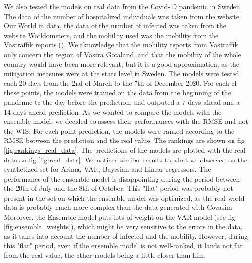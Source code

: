 We also tested the models on real data from the Covid-19 pandemic in Sweden. 
The data of the number of hospitalized individuals was taken from the website \href{https://ourworldindata.org/covid-hospitalizations}{Our World in data}, the data of the number of infected was taken from the website \href{ https://www.worldometers.info/coronavirus/country/sweden/#coronavirus-cases-linear}{Worldometers}, and the mobility used was the mobility from the Västraffik reports (\cite{gerlee2021predicting}). 
We aknowledge that the mobility reports from Västraffik only concern the region of Västra Götaland, and that the mobility of the whole country would have been more relevant, but it is a good approximation, as the mitigation measures were at the state level in Sweden. 
The models were tested each 20 days from the 2nd of March to the 7th of December 2020. 
For each of these points, the models were trained on the data from the beginning of the pandemic to the day before the prediction, and outputed a 7-days ahead and a 14-days ahead prediction. 
As we wanted to compare the models with the ensemble model, we decided to assess their performances with the RMSE and not the WIS. 
For each point prediction, the models were ranked according to the RMSE between the prediction and the real value. 
The rankings are shown on fig \ref{fig:rankings_real_data}. 
The predictions of the models are plotted with the real data on fig \ref{fig:real_data}.
We noticed similar results to what we observed on the synthetized set for Arima, VAR, Bayesian and Linear regressors.
The performance of the ensemble model is disappointing during the period between the 20th of July and the 8th of October. 
This "flat" period was probably not present in the set on which the ensemble model was optimized, as the real-world data is probably much more complex than the data generated with Covasim.
Moreover, the Ensemble model puts lots of weight on the VAR model (see fig \ref{fig:ensemble_weights}), which might be very sensitive to the errors in the data, as it takes into account the number of infected and the mobility.
However, during this "flat" period,  even if the ensemble model is not well-ranked, it lands not far from the real value, the other models being a little closer than him. 


